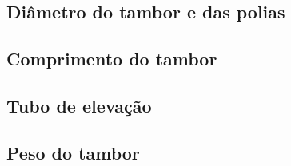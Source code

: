 \subsection{Diâmetro do tambor e das polias}


\subsection{Comprimento do tambor}


\subsection{Tubo de elevação}


\subsection{Peso do tambor}
\label{sec:peso_do_tambor}

